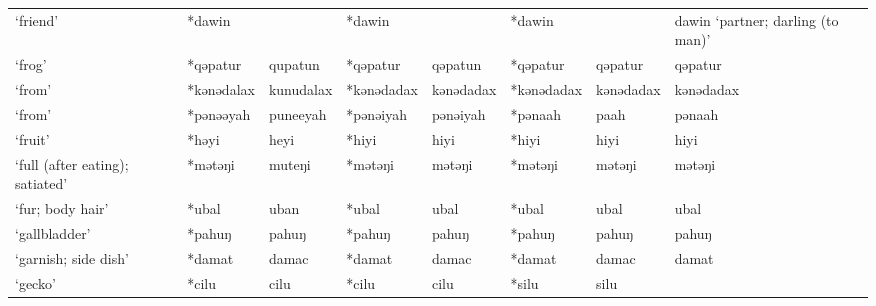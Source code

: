 \begin{landscape}
\begin{longtable}[c]{@{}p{3cm}<{\raggedright}p{2.75cm}<{\raggedright}p{2.75cm}<{\raggedright}p{2.75cm}<{\raggedright}p{2.75cm}<{\raggedright}p{2.75cm}<{\raggedright}p{2.75cm}<{\raggedright}p{2.75cm}<{\raggedright}@{}}
`friend'                                             & *dawin       &                               & *dawin         &                            & *dawin           &                          & dawin `partner; darling (to man)' \\
`frog'                                               & *qəpatur     & qupatun                       & *qəpatur       & qəpatun                    & *qəpatur         & qəpatur                  & qəpatur                           \\
`from'                                               & *kənədalax   & kunudalax                     & *kənədadax     & kənədadax                  & *kənədadax       & kənədadax                & kənədadax                         \\
`from'                                               & *pənəəyah    & puneeyah                      & *pənəiyah      & pənəiyah                   & *pənaah          & paah                     & pənaah                            \\
`fruit'                                              & *həyi        & heyi                          & *hiyi          & hiyi                       & *hiyi            & hiyi                     & hiyi                              \\
`full (after eating); satiated'                      & *mətəŋi      & muteŋi                        & *mətəŋi        & mətəŋi                     & *mətəŋi          & mətəŋi                   & mətəŋi                            \\
`fur; body hair'                                     & *ubal        & uban                          & *ubal          & ubal                       & *ubal            & ubal                     & ubal                              \\
`gallbladder'                                        & *pahuŋ       & pahuŋ                         & *pahuŋ         & pahuŋ                      & *pahuŋ           & pahuŋ                    & pahuŋ                             \\
`garnish; side dish'                                 & *damat       & damac                         & *damat         & damac                      & *damat           & damac                    & damat                             \\
`gecko'                                              & *cilu        & cilu                          & *cilu          & cilu                       & *silu            & silu                     &                                   \\

\end{longtable}
\end{landscape}
